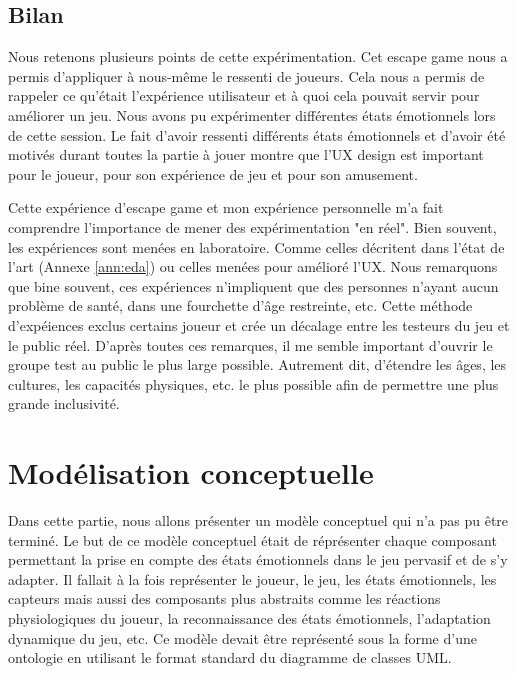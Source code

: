 \documentclass{article}
\begin{document}
	\subsection{Bilan}
		Nous retenons plusieurs points de cette expérimentation.
		Cet escape game nous a permis d'appliquer à nous-même le ressenti de joueurs.
		Cela nous a permis de rappeler ce qu'était l'expérience utilisateur et à quoi cela pouvait servir pour améliorer un jeu.
		Nous avons pu expérimenter différentes états émotionnels lors de cette session.
		Le fait d'avoir ressenti différents états émotionnels et d'avoir été motivés durant toutes la partie à jouer montre que l'UX design est important pour le joueur, pour son expérience de jeu et pour son amusement.\par
		Cette expérience d'escape game et mon expérience personnelle m'a fait comprendre l'importance de mener des expérimentation "en réel".
		Bien souvent, les expériences sont menées en laboratoire.
		Comme celles décritent dans l'état de l'art (Annexe \ref{ann:eda}) ou celles menées pour amélioré l'UX.
		Nous remarquons que bine souvent, ces expériences n'impliquent que des personnes n'ayant aucun problème de santé, dans une fourchette d'âge restreinte, etc.
		Cette méthode d'expéiences exclus certains joueur et crée un décalage entre les testeurs du jeu et le public réel.
		D'après toutes ces remarques, il me semble important d'ouvrir le groupe test au public le plus large possible.
		Autrement dit, d'étendre les âges, les cultures, les capacités physiques, etc. le plus possible afin de permettre une plus grande inclusivité.

\section{Modélisation conceptuelle}\label{sec:modelisation}
	Dans cette partie, nous allons présenter un modèle conceptuel qui n'a pas pu être terminé. 
	Le but de ce modèle conceptuel était de réprésenter chaque composant permettant la prise en compte des états émotionnels dans le jeu pervasif et de s'y adapter. 
	Il fallait à la fois représenter le joueur, le jeu, les états émotionnels, les capteurs mais aussi des composants plus abstraits comme les réactions physiologiques du joueur, la reconnaissance des états émotionnels, l'adaptation dynamique du jeu, etc. 
	Ce modèle devait être représenté sous la forme d'une ontologie en utilisant le format standard du diagramme de classes UML.
\end{document}
